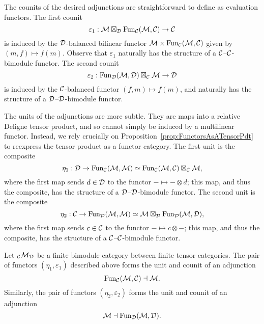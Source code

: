 \documentclass{amsart}
\begin{document}
The counits of the desired adjunctions are straightforward to define as evaluation functors.  The first counit
\[
\varepsilon_1 : \mathcal M \boxtimes_\mathcal D \operatorname{Fun}_\mathcal C(\mathcal M,\mathcal C) \rightarrow \mathcal C
\]
is induced by the $\mathcal D$-balanced bilinear functor $\mathcal M \times \operatorname{Fun}_\mathcal C(\mathcal M,\mathcal C)$ given by $(m,f) \mapsto f(m)$.  Observe that $\varepsilon_1$ naturally has the structure of a $\mathcal C$--$\mathcal C$-bimodule functor.  The second counit
\[
\varepsilon_2 : \operatorname{Fun}_\mathcal D(\mathcal M,\mathcal D) \boxtimes_\mathcal C \mathcal M \rightarrow \mathcal D
\]
is induced by the $\mathcal C$-balanced functor $(f,m) \mapsto f(m)$, and naturally has the structure of a $\mathcal D$--$\mathcal D$-bimodule functor.

The units of the adjunctions are more subtle.  They are maps into a relative Deligne tensor product, and so cannot simply be induced by a multilinear functor.  Instead, we rely crucially on Proposition~\ref{prop:FunctorsAsATensorPdt} to reexpress the tensor product as a functor category.  The first unit is the composite
\[
\eta_1 : \mathcal D \rightarrow \operatorname{Fun}_\mathcal C(\mathcal M,\mathcal M) \simeq \operatorname{Fun}_\mathcal C(\mathcal M,\mathcal C) \boxtimes_\mathcal C \mathcal M,
\]
where the first map sends $d \in \mathcal D$ to the functor $- \mapsto - \otimes d$; this map, and thus the composite, has the structure of a $\mathcal D$--$\mathcal D$-bimodule functor.  The second unit is the composite
\[
\eta_2 : \mathcal C \rightarrow \operatorname{Fun}_\mathcal D(\mathcal M,\mathcal M) \simeq \mathcal M \boxtimes_\mathcal D \operatorname{Fun}_\mathcal D(\mathcal M,\mathcal D),
\]
where the first map sends $c \in \mathcal C$ to the functor $- \mapsto c \otimes -$; this map, and thus the composite, has the structure of a $\mathcal C$--$\mathcal C$-bimodule functor.
\begin{proposition} \label{prop:evcoev}
Let ${}_\mathcal C \mathcal M_\mathcal D$ be a finite bimodule category between finite tensor categories.  The pair of functors $(\eta_1,\varepsilon_1)$ described above forms the unit and counit of an adjunction
\[
\operatorname{Fun}_\mathcal C(\mathcal M,\mathcal C) \dashv \mathcal M.
\]
Similarly, the pair of functors $(\eta_2,\varepsilon_2)$ forms the unit and counit of an adjunction
\[
\mathcal M \dashv \operatorname{Fun}_\mathcal D(\mathcal M,\mathcal D).
\]
\end{proposition}
\end{document}
